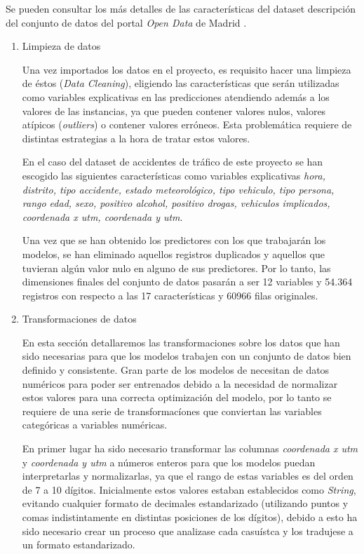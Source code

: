 \begin{enumerate}
            Se pueden consultar los más detalles de las características del dataset descripción del conjunto de datos del portal \textit{Open Data} de Madrid \cite{InfoDatasetMadrid}.


            \begin{enumerate}

                \item Limpieza de datos

                    Una vez importados los datos en el proyecto, es requisito hacer una limpieza de éstos (\textit{Data Cleaning}), eligiendo las características que serán utilizadas como variables explicativas en las predicciones atendiendo además a los valores de las instancias, ya que pueden contener valores nulos, valores atípicos (\textit{outliers}) o contener valores erróneos. Esta problemática requiere de distintas estrategias a la hora de tratar estos valores.

                    En el caso del dataset de accidentes de tráfico de este proyecto se han escogido las siguientes características como variables explicativas \textit{hora, distrito, tipo accidente, estado meteorológico, tipo vehiculo, tipo persona, rango edad, sexo, positivo alcohol, positivo drogas, vehiculos implicados, coordenada x utm, coordenada y utm}.


                    Una vez que se han obtenido los predictores con los que trabajarán los modelos, se han eliminado aquellos registros duplicados y aquellos que tuvieran algún valor nulo en alguno de sus predictores. Por lo tanto, las dimensiones finales del conjunto de datos pasarán a ser 12 variables y 54.364 registros con respecto a las 17 características y 60966 filas originales. 

                \item Transformaciones de datos

                    En esta sección detallaremos las transformaciones sobre los datos que han sido necesarias para que los modelos trabajen con un conjunto de datos bien definido y consistente. Gran parte de los modelos de  necesitan de datos numéricos para poder ser entrenados debido a la necesidad de normalizar estos valores para una correcta optimización del modelo, por lo tanto se requiere de una serie de transformacíones que conviertan las variables categóricas a variables numéricas.

                    En primer lugar ha sido necesario transformar las columnas \textit{coordenada x utm} y \textit{coordenada y utm} a números enteros para que los modelos puedan interpretarlas y normalizarlas, ya que el rango de estas variables es del orden de 7 a 10 dígitos. Inicialmente estos valores estaban establecidos como \textit{String}, evitando cualquier formato de decimales estandarizado (utilizando puntos y comas indistintamente en distintas posiciones de los dígitos), debido a esto ha sido necesario crear un proceso que analizase cada casuístca y los tradujese a un formato estandarizado.


\end{enumerate}
\end{enumerate}
